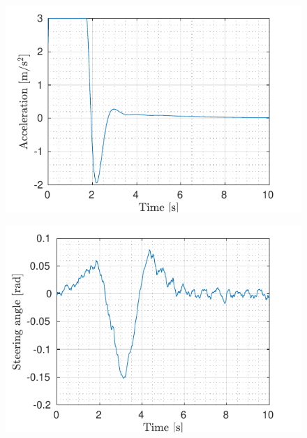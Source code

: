 \begin{figure}[!h]
\begin{minipage}[t]{0.49\textwidth}
		\includegraphics[width=\textwidth]{../../MATLAB/lane_following_curve/figure/AccelerationVsTime_curve.pdf}
		\label{fig:acceleration_laneFollowing_curve}
	\end{minipage}
	\begin{minipage}[t]{0.49\textwidth}
		\includegraphics[width=\textwidth]{../../MATLAB/lane_following_curve/figure/SteeringAngleVsTime_curve.pdf}
		\label{fig:steering_laneFollowing_curve}
	\end{minipage}
	\begin{minipage}[t]{0.49\textwidth}

\end{minipage}
\end{figure}
